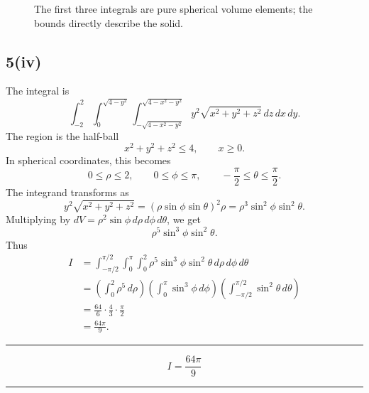 \documentclass[11pt,a4paper]{article}
\newenvironment{resultbox}{\par\medskip\noindent\begin{minipage}{\linewidth}\hrule\smallskip}{\smallskip\hrule\end{minipage}\par\medskip}
\newcommand{\ans}[1]{\begin{resultbox}\[\boxed{#1}\]\end{resultbox}}
\begin{document}
\begin{figure}[H]
\centering
{}
\caption{The first three integrals are pure spherical volume elements; the bounds directly describe the solid.}
\end{figure}

\subsection*{5(iv)}
The integral is
\[
\int_{-2}^{2}\int_0^{\sqrt{4-y^2}}
\int_{-\sqrt{4-x^2-y^2}}^{\sqrt{4-x^2-y^2}}
 y^2\sqrt{x^2+y^2+z^2}\,dz\,dx\,dy.
\]
The region is the half-ball
\[
x^2+y^2+z^2\le4,
\qquad x\ge0.
\]
In spherical coordinates, this becomes
\[
0\le\rho\le2,
\qquad 0\le\phi\le\pi,
\qquad -\frac\pi2\le\theta\le\frac\pi2.
\]
The integrand transforms as
\[
y^2\sqrt{x^2+y^2+z^2}
=(\rho\sin\phi\sin\theta)^2\rho
=\rho^3\sin^2\phi\sin^2\theta.
\]
Multiplying by \(dV=\rho^2\sin\phi\,d\rho\,d\phi\,d\theta\), we get
\[
\rho^5\sin^3\phi\sin^2\theta.
\]
Thus
\begin{align*}
I&=\int_{-\pi/2}^{\pi/2}\int_0^\pi\int_0^2
\rho^5\sin^3\phi\sin^2\theta\,d\rho\,d\phi\,d\theta\\
&=\left(\int_0^2\rho^5\,d\rho\right)
\left(\int_0^\pi\sin^3\phi\,d\phi\right)
\left(\int_{-\pi/2}^{\pi/2}\sin^2\theta\,d\theta\right)\\
&=\frac{64}{6}\cdot\frac43\cdot\frac\pi2\\
&=\frac{64\pi}{9}.
\end{align*}
\ans{I=\frac{64\pi}{9}}
\end{document}
